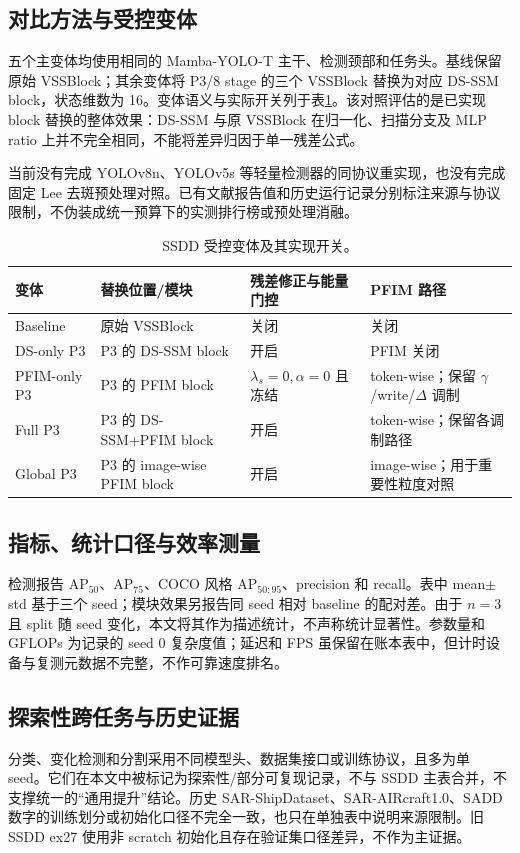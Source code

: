 \documentclass[UTF8,12pt,a4paper]{ctexart}
\begin{document}
\subsection{对比方法与受控变体}
五个主变体均使用相同的 Mamba-YOLO-T 主干、检测颈部和任务头。基线保留原始 VSSBlock；其余变体将 P3/8 stage 的三个 VSSBlock 替换为对应 DS-SSM block，状态维数为 16。变体语义与实际开关列于表\ref{tab:variants}。该对照评估的是已实现 block 替换的整体效果：DS-SSM 与原 VSSBlock 在归一化、扫描分支及 MLP ratio 上并不完全相同，不能将差异归因于单一残差公式。

当前没有完成 YOLOv8n、YOLOv5s 等轻量检测器的同协议重实现，也没有完成固定 Lee 去斑预处理对照。已有文献报告值和历史运行记录分别标注来源与协议限制，不伪装成统一预算下的实测排行榜或预处理消融。
\begin{table}[H]\centering\scriptsize
\caption{SSDD 受控变体及其实现开关。}
\label{tab:variants}
\begin{tabularx}{\linewidth}{p{2.5cm}p{3.2cm}p{3.0cm}X}
\toprule
变体 & 替换位置/模块 & 残差修正与能量门控 & PFIM 路径\\
\midrule
Baseline & 原始 VSSBlock & 关闭 & 关闭\\
DS-only P3 & P3 的 DS-SSM block & 开启 & PFIM 关闭\\
PFIM-only P3 & P3 的 PFIM block & $\lambda_s=0,\alpha=0$ 且冻结 & token-wise；保留 $\gamma$/write/$\Delta$ 调制\\
Full P3 & P3 的 DS-SSM+PFIM block & 开启 & token-wise；保留各调制路径\\
Global P3 & P3 的 image-wise PFIM block & 开启 & image-wise；用于重要性粒度对照\\
\bottomrule
\end{tabularx}
\end{table}

\subsection{指标、统计口径与效率测量}
检测报告 AP$_{50}$、AP$_{75}$、COCO 风格 AP$_{50:95}$、precision 和 recall。表中 mean$\pm$std 基于三个 seed；模块效果另报告同 seed 相对 baseline 的配对差。由于 $n=3$ 且 split 随 seed 变化，本文将其作为描述统计，不声称统计显著性。参数量和 GFLOPs 为记录的 seed 0 复杂度值；延迟和 FPS 虽保留在账本表中，但计时设备与复测元数据不完整，不作可靠速度排名。

\subsection{探索性跨任务与历史证据}
分类、变化检测和分割采用不同模型头、数据集接口或训练协议，且多为单 seed。它们在本文中被标记为探索性/部分可复现记录，不与 SSDD 主表合并，不支撑统一的“通用提升”结论。历史 SAR-ShipDataset、SAR-AIRcraft1.0、SADD 数字的训练划分或初始化口径不完全一致，也只在单独表中说明来源限制。旧 SSDD ex27 使用非 scratch 初始化且存在验证集口径差异，不作为主证据。
\end{document}
